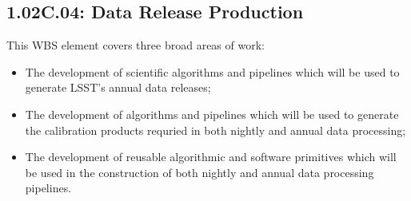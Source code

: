 \subsection*{1.02C.04: Data Release Production}

This WBS element covers three broad areas of work:

\begin{itemize}

  \item{The development of scientific algorithms and pipelines which will be
  used to generate LSST's annual data releases;}

  \item{The development of algorithms and pipelines which will be used to
  generate the calibration products requried in both nightly and annual data
  processing;}

  \item{The development of reusable algorithmic and software primitives which
  will be used in the construction of both nightly and annual data processing
  pipelines.}

\end{itemize}
